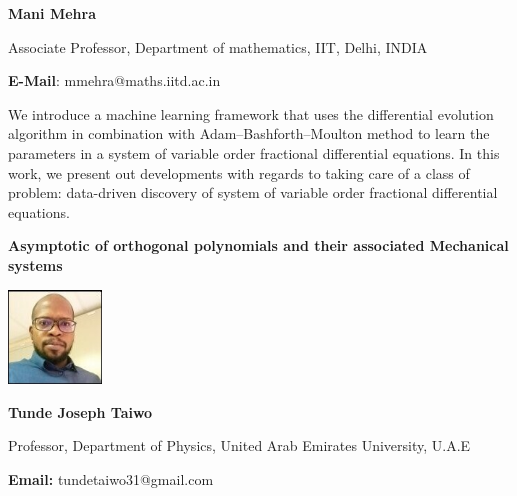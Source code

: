 \documentclass[twoside,11pt]{amsart}
\begin{document}
\centerline{\textbf{ Mani Mehra }}
\vskip 2mm
\begin{flushleft}
Associate Professor, Department of mathematics, IIT, Delhi, INDIA
\end{flushleft}
\vskip 2mm
\begin{flushleft}
\textbf{E-Mail}: mmehra@maths.iitd.ac.in
\end{flushleft}

\vskip 10mm
We introduce a machine learning framework that uses the differential evolution algorithm in combination with Adam–Bashforth–Moulton method to learn the parameters in a system of variable order fractional differential equations. In this work, we present out developments with regards to taking care of a class of problem: data-driven discovery of system of variable order fractional differential equations.
\vskip 5mm
\newpage


\vskip 10mm
\begin{center}\bf\LARGE
Asymptotic of orthogonal polynomials and their associated Mechanical systems

\end{center}
\vskip 5mm
\begin{center}
\includegraphics[width=2.5cm, height=2.5cm, keepaspectratio=false]{TJT2.jpg}
\end{center}
\vskip 2mm
\centerline{\textbf{  Tunde Joseph Taiwo }}
\vskip 2mm
\begin{flushleft}
Professor, Department of Physics, United Arab Emirates University, U.A.E
\end{flushleft}
\vskip 2mm
\begin{flushleft}
{\bf Email:} tundetaiwo31@gmail.com
\end{flushleft}
\end{document}

